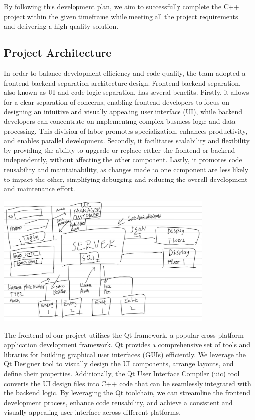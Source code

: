 {By following this development plan, we aim to successfully complete the
C++ project within the given timeframe while meeting all the project
requirements and delivering a high-quality solution.

\hypertarget{project-architecture}{%
\subsection{Project Architecture}\label{project-architecture}}

In order to balance development efficiency and code quality, the team
adopted a frontend-backend separation architecture design.
Frontend-backend separation, also known as UI and code logic separation,
has several benefits. Firstly, it allows for a clear separation of
concerns, enabling frontend developers to focus on designing an
intuitive and visually appealing user interface (UI), while backend
developers can concentrate on implementing complex business logic and
data processing. This division of labor promotes specialization,
enhances productivity, and enables parallel development. Secondly, it
facilitates scalability and flexibility by providing the ability to
upgrade or replace either the frontend or backend independently, without
affecting the other component. Lastly, it promotes code reusability and
maintainability, as changes made to one component are less likely to
impact the other, simplifying debugging and reducing the overall
development and maintenance effort.

\begin{center}
  \centering
  \includegraphics[width=0.8\textwidth]{pics/1.png}
\end{center}


The frontend of our project utilizes the Qt framework, a popular
cross-platform application development framework. Qt provides a
comprehensive set of tools and libraries for building graphical user
interfaces (GUIs) efficiently. We leverage the Qt Designer tool to
visually design the UI components, arrange layouts, and define their
properties. Additionally, the Qt User Interface Compiler (uic) tool
converts the UI design files into C++ code that can be seamlessly
integrated with the backend logic. By leveraging the Qt toolchain, we
can streamline the frontend development process, enhance code
reusability, and achieve a consistent and visually appealing user
interface across different platforms.

}
